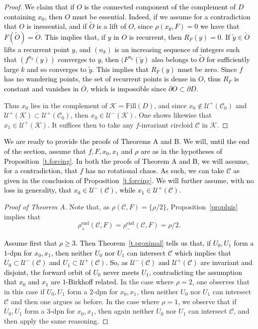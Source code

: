 \documentclass[12pt,a4paper]{amsart}
\theoremstyle{definition}
\theoremstyle{remark}
\begin{document}
\begin{proof}
\textcolor{black}{We claim that if $O$ is the connected component of the complement of $D$ containing $x_0$, then $O$ must be essential. Indeed, if we assume for a contradiction that $O$ is inessential, and if $\widetilde{O}$ is a lift of $O$, since $\rho(x_0,F)=0$ we have that $F(\widetilde{O})=\widetilde{O}$. This implies that, if $y$ in $O$ is recurrent, then $R_F(y)=0$. If $\tilde y \in \widetilde O$ lifts a recurrent point $y$, and $(n_k)$ is an increasing sequence of integers such that $(f^{n_k}(y))$ converges to $y$, then $(F^{n_k}(\tilde y)$ also belongs to $\widetilde O$ for sufficiently large $k$ and so converges to $\tilde y$. This implies that $R_F(y)$ must be zero. Since $f$ has no wandering points, the set of recurrent points is dense in $O$, thus $R_F$ is constant and vanishes in $\overline{O}$, which is impossible since $\partial O\subset\partial D$.}

Thus $x_0$ lies in the complement of $\mathcal{K}=\mathrm{Fill}(D)$, and since $x_0\notin \mathcal{U}^{+}(\mathcal{C}_0)$ and $\mathcal{U}^{+}(\mathcal{K})\subset\mathcal{U}^{+}(\mathcal{C}_0)$, then $x_0\in\mathcal{U}^{-}(\mathcal{K})$.  One shows likewise that $x_1\in\mathcal{U}^{+}(\mathcal{K})$. It suffices then to take any $f$-invariant circloid $\mathcal{C}$ in $\mathcal{K}$.   
\end{proof}


\textcolor{black}{We are ready to provide the proofs of Theorems A and B. We will, until the end of the section, assume that $f,F,x_0,x_1$ and $\rho$ are as in the hypotheses of Proposition~\ref{t.forcing}. In both the proofs of Theorem A and B, we will assume, for a contradiction, that $f$ has no rotational chaos. As such, we can take $\mathcal{C}$ as given in the conclusion of Proposition~\ref{t.forcing}. We will further assume, with no loss in generality, that $x_0\in\mathcal{U}^{-}(\mathcal{C})$, while $x_1\in\mathcal{U}^{+}(\mathcal{C})$.}

\medskip

\begin{proof}[Proof of Theorem A] Note that, as $\rho(\mathcal{C},F)=\{\rho/2\}$, Proposition~\ref{propluis} implies that
$$\rho^{\mathrm{end}}_{+}(\mathcal{C},F)=\rho^{\mathrm{end}}_{-}(\mathcal{C},F)=\rho/2.$$ 

\textcolor{black}{Assume first that $\rho\ge 3$. Then Theorem~\ref{t.proximal} tells us that, if $U_0, U_1$ form a $1$-dpn for $x_0, x_1$, then neither $U_0$ nor $U_1$ can intersect $\mathcal{C}$ which implies that $U_0\subset \mathcal{U}^{-}(\mathcal{C})$ and $U_1\subset \mathcal{U}^{+}(\mathcal{C})$. So, as $\mathcal{U}^{-}(\mathcal{C})$ and $\mathcal{U}^{+}(\mathcal{C})$ are invariant and disjoint, the forward orbit of $U_0$ never meets $U_1$, contradicting the assumption that $x_0$ and $x_1$ are $1$-Birkhoff related.} In the case where $\rho=2$, one observes that in this case if $U_0, U_1$ form a $2$-dpn for $x_0, x_1$, then neither $U_0$ nor $U_1$ can intersect $\mathcal{C}$ and then one argues as before. In the case where $\rho=1$, we observe that if $U_0, U_1$ form a $3$-dpn for $x_0, x_1$, then again neither $U_0$ nor $U_1$ can intersect $\mathcal{C}$, and then apply the same reasoning.
\end{proof}
\end{document}
